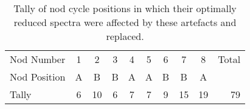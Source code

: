 \begin{table}
    \centering
    \caption[Nod position tally of artefacts.]{Tally of nod cycle positions in which their optimally reduced spectra were affected by these artefacts and replaced.}
    \begin{tabular}{lccccccccr}
        \toprule
        Nod Number & 1 & 2 & 3 & 4 & 5 & 6 & 7 & 8 & Total \\
        Nod Position & A & B & B & A & A & B & B & A & \\
        \midrule
        Tally & 6 & 10 & 6 & 7 & 7 & 9 & 15 & 19 & 79 \\
        \bottomrule
    \end{tabular}\label{tab:nod_artefact_tally}
\end{table}